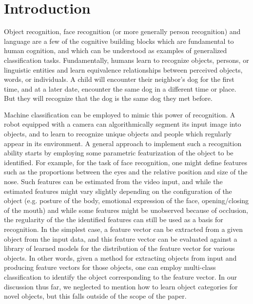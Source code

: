 \documentclass[12pt]{article}
\begin{document}
\maketitle

\newcommand{\tr}{\text{tr}}
\newcommand{\E}{\textbf{E}}
\newcommand{\diag}{\text{diag}}
\newcommand{\argmax}{\text{argmax}}
\newcommand{\Cov}{\text{Cov}}
\newcommand{\Var}{\text{Var}}
\newcommand{\argmin}{\text{argmin}}
\newcommand{\Vol}{\text{Vol}}
\newcommand{\comm}[1]{}

\section{Introduction}

Object recognition, face recognition (or more generally person recognition) and language are a few of
the cognitive building blocks which are fundamental to human cognition, and which can be understood as
examples of generalized classification tasks.  Fundamentally, humans learn to recognize objects,
persons, or linguistic entities and learn equivalence relationships between perceived objects, words,
or individuals.  A child will encounter their neighbor's dog for the first time, and at a later date,
encounter the same dog in a different time or place.  But they will recognize that the dog is the same dog
they met before.

Machine classification can be employed to mimic this power of recognition.
A robot equipped with a camera can algorithmically segment its input image into objects,
and to learn to recognize unique objects and people which regularly appear in its environment.
A general approach to implement such a recognition ability starts by employing some
parametric featurization of the object to be identified.  For example, for the task of
face recognition, one might define features such as the proportions between the eyes and the relative position
and size of the nose.  Such features can be estimated from the video input,
and while the estimated features might vary slightly depending on the configuration of the object
(e.g. posture of the body, emotional expression of the face, opening/closing of the mouth)
and while some features might be unobserved because of occlusion,
the regularity of the the identified features can still be used as a basis for recognition.
In the simplest case, a feature vector can be extracted from a given object from the input data,
and this feature vector can be evaluated against a library of learned models
for the distribution of the feature vector for various objects.
In other words, given a method for extracting objects from input and producing feature vectors
for those objects, one can employ multi-class classification to identify the object corresponding to the
feature vector.  In our discussion thus far, we neglected to mention how to learn
object categories for novel objects, but this falls outside of the scope of the paper.
\end{document}
